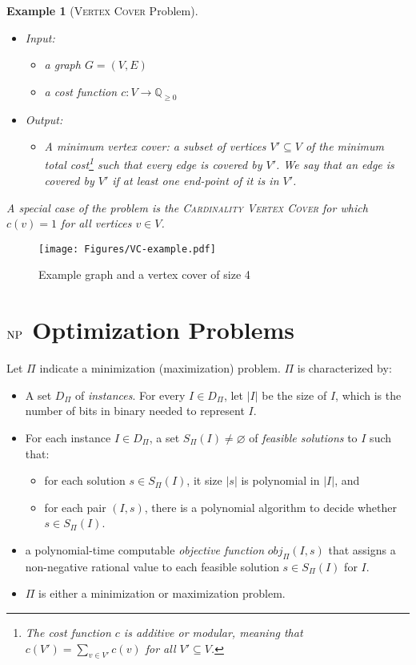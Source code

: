 \documentclass[twoside]{article}
\newtheorem{example}{Example}
\def\NP{\mathop{\rm NP}\nolimits}
\newcommand{\abs}[1]{\ensuremath{\left|#1\right|}}
\begin{document}
\begin{example}[\textsc{Vertex Cover} Problem] 
\label{eg:VC}\,
\begin{itemize}
    \item Input:
    \begin{itemize}
        \item a graph $G = (V, E)$
        \item a cost function $c: V \rightarrow \mathbb{Q}_{\geq 0}$
    \end{itemize}
    \item Output:
    \begin{itemize}
        \item A minimum \emph{vertex cover}: a subset of vertices $V' \subseteq V$ of the minimum total cost\footnote{The cost function $c$ is \emph{additive} or \emph{modular}, meaning that $c(V') = \sum_{v \in V'} c(v)$ for all $V' \subseteq V$.} such that every edge is \emph{covered} by $V'$. We say that an edge is covered by $V'$ if at least one end-point of it is in $V'$.
    \end{itemize}
\end{itemize}
A special case of the problem is the \textsc{Cardinality Vertex Cover} for which $c(v) = 1$ for all vertices $v \in V$.
\end{example}

\begin{figure}
    \centering
    \texttt{[image: Figures/VC-example.pdf]}
    \caption{Example graph and a vertex cover of size 4}
    \label{fig:my_label}
\end{figure}

\section{$\NP$ Optimization Problems}
Let $\Pi$ indicate a minimization (maximization) problem. $\Pi$ is characterized by:
\begin{itemize}
    \item A set $D_\Pi$ of \emph{instances}. For every $I \in D_\Pi$, let $\abs{I}$ be the size of $I$, which is the number of bits in binary needed to represent $I$.
    \item For each instance $I \in D_\Pi$, a set $S_\Pi(I) \neq \varnothing$ of \emph{feasible solutions} to $I$ such that:
    \begin{itemize}
        \item for each solution $s \in S_\Pi(I)$, it size $\abs{s}$ is polynomial in $\abs{I}$, and
        \item for each pair $(I, s)$, there is a polynomial algorithm to decide whether $s \in S_\Pi(I)$.
    \end{itemize}
    \item a polynomial-time computable \emph{objective function} $obj_\Pi(I, s)$ that assigns a non-negative rational value to each feasible solution $s \in S_\Pi(I)$ for $I$.
    \item $\Pi$ is either a minimization or maximization problem.
\end{itemize}
\end{document}
